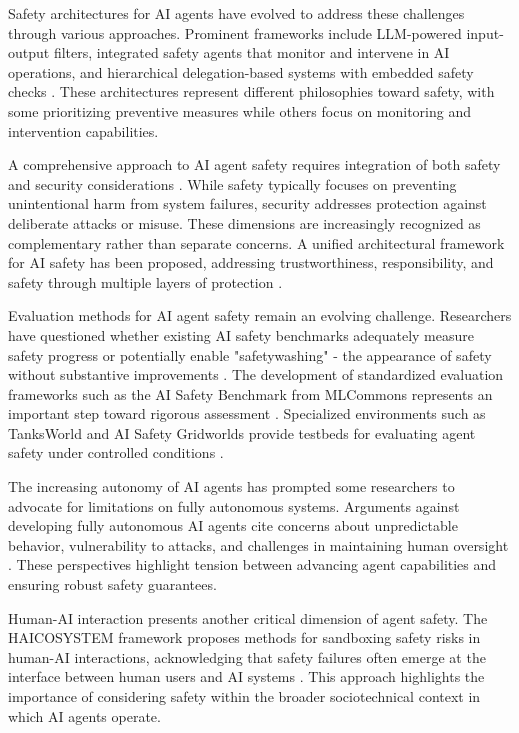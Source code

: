 \documentclass[conference]{IEEEtran}
\begin{document}
Safety architectures for AI agents have evolved to address these challenges through various approaches. Prominent frameworks include LLM-powered input-output filters, integrated safety agents that monitor and intervene in AI operations, and hierarchical delegation-based systems with embedded safety checks \cite{2409.03793}. These architectures represent different philosophies toward safety, with some prioritizing preventive measures while others focus on monitoring and intervention capabilities.

A comprehensive approach to AI agent safety requires integration of both safety and security considerations \cite{2405.19524}. While safety typically focuses on preventing unintentional harm from system failures, security addresses protection against deliberate attacks or misuse. These dimensions are increasingly recognized as complementary rather than separate concerns. A unified architectural framework for AI safety has been proposed, addressing trustworthiness, responsibility, and safety through multiple layers of protection \cite{2408.12935}.

Evaluation methods for AI agent safety remain an evolving challenge. Researchers have questioned whether existing AI safety benchmarks adequately measure safety progress or potentially enable "safetywashing" - the appearance of safety without substantive improvements \cite{2407.21792}. The development of standardized evaluation frameworks such as the AI Safety Benchmark from MLCommons represents an important step toward rigorous assessment \cite{2404.12241}. Specialized environments such as TanksWorld and AI Safety Gridworlds provide testbeds for evaluating agent safety under controlled conditions \cite{2002.11174, 1711.09883}.

The increasing autonomy of AI agents has prompted some researchers to advocate for limitations on fully autonomous systems. Arguments against developing fully autonomous AI agents cite concerns about unpredictable behavior, vulnerability to attacks, and challenges in maintaining human oversight \cite{2502.02649}. These perspectives highlight tension between advancing agent capabilities and ensuring robust safety guarantees.

Human-AI interaction presents another critical dimension of agent safety. The HAICOSYSTEM framework proposes methods for sandboxing safety risks in human-AI interactions, acknowledging that safety failures often emerge at the interface between human users and AI systems \cite{2409.16427}. This approach highlights the importance of considering safety within the broader sociotechnical context in which AI agents operate.
\end{document}

